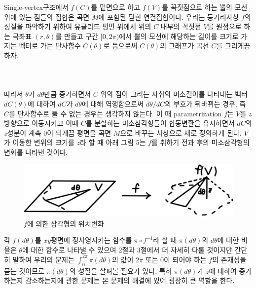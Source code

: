 \documentclass[11pt]{article}
\begin{document}
Single-vertex구조에서 $f(C)$를 밑면으로 하고 $f(V)$를 꼭짓점으로 하는 뿔의 모선 위에 있는 점들의 집합은 곡면 $M$에 포함된 닫힌 연결집합이다. 우리는 등거리사상 $f$의 성질을 파악하기 위하여 유클리드 평면 위에서 위의 $C$ 내부의 꼭짓점 $V$를 원점으로 하는 극좌표 $(r,\theta )$를 만들고 구간 $[0,2\pi)$에서 뿔의 모선에 해당하는 길이를 크기로 가지는 벡터로 가는 단사함수 $C(\theta)$로 둠으로써 $C(\theta)$의 그래프가 곡선 $C$를 그리게끔 하자. %
\\
\\
\\
\\
 따라서 $\theta$가 $d\theta$만큼 증가하면서 $C$ 위의 점이 그리는 자취의 미소길이를 나타내는 벡터 $dC(\theta)$에 대하여 $dC$가 $d\theta$에 대해 역행함으로써 $d\theta/dC$의 부호가 뒤바뀌는 경우, 즉 $C$를 단사함수로 둘 수 없는 경우는 생각하지 않는다.
이 때 parametrization $f$는 $V$를 $z$방향으로 이동시키고 이때 $C$를 분할하는 미소삼각형들이 합동변환을 유지하면서 $dC$의 $z$성분이 계속 0이 되게끔 평면을 곡면 $M$으로 바꾸는 사상으로 새로 정의하게 된다. $V$가 이동한 변위의 크기를 $z$라 할 때 아래 그림 5는 $f$를 취하기 전과 후의 미소삼각형의 변화를 나타낸 것이다.




\begin{figure}
\centering
\includegraphics{5.png}
\caption{$f$에 의한 삼각형의 위치변화}
\end{figure}


각 $f(d\theta)$를 $xy$평면에 정사영시키는 함수를 $\pi \circ f^{-1}$라 할 때 $\pi(d\theta)$의 $d\theta$에 대한 비율은 $\theta$에 대한 함수로 나타낼 수 있으며 2절과 3절에서 더 자세히 다룰 것이지만 간단히 말하여 우리의 문제는 $\int_0^{2\pi}\pi(d\theta)$의 값이 $2\pi$ 또는 0이 되어야 하는 $f$의 존재성을 묻는 것이므로 $\pi(d\theta)$의 성질을 살펴볼 필요가 있다. 특히 $\pi(d\theta)$가 $z$에 대하여 증가하는지 감소하는지에 관한 문제는 본 문제의 해결에 있어 굉장히 큰 역할을 한다.
\end{document}
